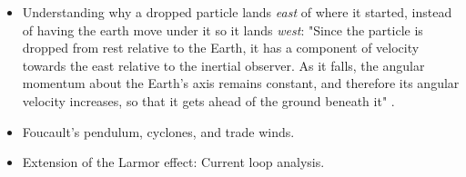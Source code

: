 \documentclass[../notes.tex]{subfiles}
\begin{document}
\begin{itemize}
\begin{figure}[H]
\begin{subfigure}[b]{0.3\linewidth}
            \caption{Rotating reference frame.}
            \label{fig:coriolisForceb}
        \end{subfigure}
        \caption{The Coriolis force in 2D.}
        \label{fig:coriolisForce}
    \end{figure}
    \begin{itemize}
        \item View the Earth from north pole so that it rotates counterclockwise beneath us with angular velocity $\omega$, as in Figure \ref{fig:coriolisForcea}. Alternatively, consider Figure \ref{fig:coriolisForcea} to represent a 2D disk rotating with angular velocity $\omega$.
        \item Let a particle travel across the disk.
        \begin{itemize}
            \item If we are in an inertial reference frame, it appears as if the particle takes a straight line (Figure \ref{fig:coriolisForcea}).
            \item If we are in a rotating reference frame, then it appears as if some force is curving the particle (Figure \ref{fig:coriolisForceb}).
        \end{itemize}
    \end{itemize}
    \item Understanding why a dropped particle lands \emph{east} of where it started, instead of having the earth move under it so it lands \emph{west}: "Since the particle is dropped from rest relative to the Earth, it has a component of velocity towards the east relative to the inertial observer. As it falls, the angular momentum about the Earth's axis remains constant, and therefore its angular velocity increases, so that it gets ahead of the ground beneath it" \parencite[116-17]{bib:KibbleBerkshire}.
    \item Foucault's pendulum, cyclones, and trade winds.
    \item Extension of the Larmor effect: Current loop analysis.
\end{itemize}
\end{document}
